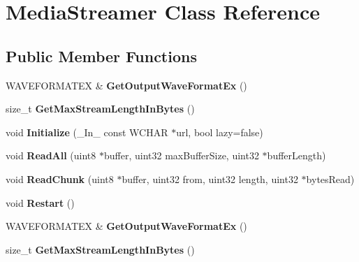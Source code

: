 \hypertarget{classMediaStreamer}{}\section{Media\+Streamer Class Reference}
\label{classMediaStreamer}
\subsection*{Public Member Functions}
\begin{DoxyCompactItemize}
\item 
\mbox{\label{classMediaStreamer_a90fe66714625429cca56f4fb81073bc0}} 
W\+A\+V\+E\+F\+O\+R\+M\+A\+T\+EX \& {\bfseries Get\+Output\+Wave\+Format\+Ex} ()
\item 
\mbox{\label{classMediaStreamer_a3c3494e36a50c117e2b9f3256d20f1f5}} 
size\+\_\+t {\bfseries Get\+Max\+Stream\+Length\+In\+Bytes} ()
\item 
\mbox{\label{classMediaStreamer_a47b1a8c8e991f1606c6a01b4fc977bc6}} 
void {\bfseries Initialize} (\+\_\+\+In\+\_\+ const W\+C\+H\+AR $\ast$url, bool lazy=false)
\item 
\mbox{\label{classMediaStreamer_a7a7bfa40fc9eb7482633cd6ff39ff1c8}} 
void {\bfseries Read\+All} (uint8 $\ast$buffer, uint32 max\+Buffer\+Size, uint32 $\ast$buffer\+Length)
\item 
\mbox{\label{classMediaStreamer_abc684e7e49628e6ecf47767f05283500}} 
void {\bfseries Read\+Chunk} (uint8 $\ast$buffer, uint32 from, uint32 length, uint32 $\ast$bytes\+Read)
\item 
\mbox{\label{classMediaStreamer_aa76aa442a90e0c7983da9419cd243639}} 
void {\bfseries Restart} ()
\item 
\mbox{\label{classMediaStreamer_a90fe66714625429cca56f4fb81073bc0}} 
W\+A\+V\+E\+F\+O\+R\+M\+A\+T\+EX \& {\bfseries Get\+Output\+Wave\+Format\+Ex} ()
\item 
\mbox{\label{classMediaStreamer_a3c3494e36a50c117e2b9f3256d20f1f5}} 
size\+\_\+t {\bfseries Get\+Max\+Stream\+Length\+In\+Bytes} ()

\end{DoxyCompactItemize}
